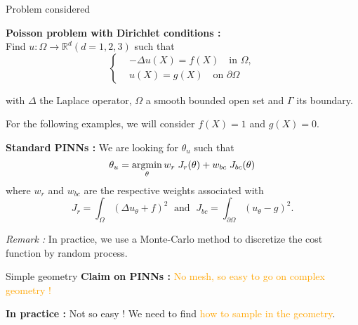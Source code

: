 \begin{frame}{Problem considered}
	\vspace{5pt}
    \begin{minipage}{0.7\linewidth}
    	\textbf{Poisson problem with Dirichlet conditions :} \\
    	Find $u : \Omega \rightarrow \mathbb{R}^d (d=1,2,3)$ such that
    	\vspace{-10pt}
    	\begin{equation*}
    		\left\{\begin{aligned}
    			&-\Delta u(X) = f(X) \quad \text{in } \Omega, \\
    			&u(X) = g(X) \quad \text{on } \partial \Omega
    		\end{aligned}\right. \label{edp}
    	\end{equation*}
    \end{minipage}
	\begin{minipage}{0.26\linewidth}
		\vspace{-20pt}
	\end{minipage}
	
	with $\Delta$ the Laplace operator, $\Omega$ a smooth bounded open set and $\Gamma$ its boundary. 
	
	For the following examples, we will consider $f(X)=1$ and $g(X)=0$.
	
	\vspace{5pt}
	
	\textbf{Standard PINNs :} We are looking for $\theta_u$ such that
	\begin{equation*}
		\theta_u = \operatorname*{argmin}_{\theta} w_{r}\; J_{r}(\theta)+w_{bc}\; J_{bc}(\theta)
	\end{equation*}
	where $w_{r}$ and $w_{bc}$ are the respective weights associated with
	\begin{equation*}
		J_{r} = \int_\Omega (\Delta u_\theta+f)^2 \; \text{ and } \; J_{bc} = \int_{\partial\Omega} (u_\theta-g)^2.
	\end{equation*}	
	
	\footnotesize
	\textit{Remark :} In practice, we use a Monte-Carlo method to discretize the cost function by random process.
\end{frame}

\begin{frame}{Simple geometry}
	\textbf{Claim on PINNs :} \textcolor{orange}{No mesh, so easy to go on complex geometry !}
	
	\centering
	
	\flushleft
	\textbf{In practice :} Not so easy ! We need to find \textcolor{orange}{how to sample in the geometry}.
\end{frame}

